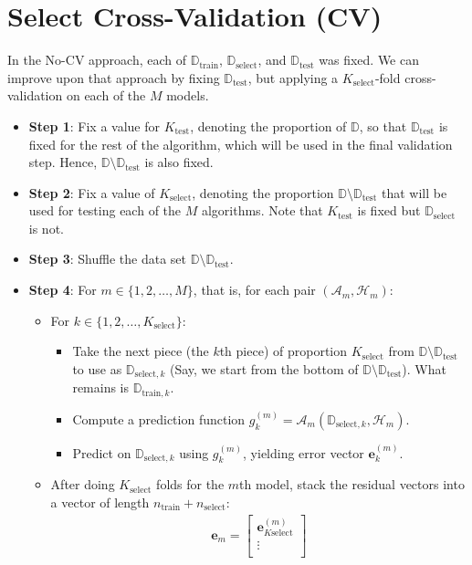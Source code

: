 \documentclass[12pt, a4paper]{article}
\theoremstyle{definition}
\newcommand{\test}{\text{test}}
\newcommand{\train}{\text{train}}
\newcommand{\select}{\text{select}}
\newcommand{\Dtest}{\mathbb{D}_{\test}}
\newcommand{\Dtrain}{\mathbb{D}_{\train}}
\newcommand{\Dselect}{\mathbb{D}_{\select}}
\begin{document}
	\section*{Select Cross-Validation (CV)}
	In the No-CV approach, each of $\Dtrain$, $\Dselect$, and $\Dtest$ was fixed.
	We can improve upon that approach by fixing $\Dtest$, but applying a $K_\select$-fold
	cross-validation on each of the $M$ models.
	\begin{itemize}
		\item \textbf{Step 1}: Fix a value for $K_\test$, denoting the proportion
		of $\mathbb{D}$, so that $\Dtest$ is fixed for the rest of the algorithm,
		which will be used in the final validation step. Hence, $\mathbb{D}\setminus \Dtest$
		is also fixed.
		\item \textbf{Step 2}: Fix a value of $K_\select$, denoting the proportion $\mathbb{D}\setminus \Dtest$
		that will be used for testing each of the $M$ algorithms. Note that $K_\test$
		is fixed but $\Dselect$ is not.
		\item \textbf{Step 3}: Shuffle the data set $\mathbb{D}\setminus \Dtest$.
		\item \textbf{Step 4}: For $m\in \{1,2,\ldots,M\}$, that is, for each pair
		$(\mathcal{A}_m,\mathcal{H}_m)$:
		\begin{itemize}
			\item For $k\in \{1,2,\ldots,K_\select\}$:
			\begin{itemize}
				\item Take the next piece (the $k$th piece) of proportion $K_\select$
				from $\mathbb{D}\setminus \Dtest$ to use as $\mathbb{D}_{\text{select}, k}$
				(Say, we start from the bottom of $\mathbb{D}\setminus \Dtest$).
				What remains is $\mathbb{D}_{\text{train}, k}$.
				\item Compute a prediction function $g_{k}^{(m)}=\mathcal{A}_m(\mathbb{D}_{\text{select}, k}, \mathcal{H}_m)$.
				\item Predict on $\mathbb{D}_{\text{select}, k}$ using $g_{k}^{(m)}$, yielding error
				vector $\bm{e}_k^{(m)}$.
			\end{itemize}
			\item After doing $K_\select$ folds for the $m$th model, stack the residual
			vectors into a vector of length $n_\train + n_\select$:
			\begin{align*}
				\bm{e}_m = 
					\begin{bmatrix}
						\bm{e}_{K\select}^{(m)}\\
						\vdots\\

\end{bmatrix}
\end{align*}
\end{itemize}
\end{itemize}
\end{document}
